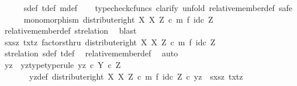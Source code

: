 \begin{isabellebody}
\ \ \ \ \isamarkupfalse%
\ s{\isacharunderscore}{\kern0pt}def\ t{\isacharunderscore}{\kern0pt}def\ m{\isacharunderscore}{\kern0pt}def\isanewline
\ \ \isamarkupfalse%
\ {\isacharparenleft}{\kern0pt}typecheck{\isacharunderscore}{\kern0pt}cfuncs{\isacharcomma}{\kern0pt}\ clarify{\isacharcomma}{\kern0pt}\ unfold\ relative{\isacharunderscore}{\kern0pt}member{\isacharunderscore}{\kern0pt}def{}{\isacharcomma}{\kern0pt}\ safe{\isacharparenright}{\kern0pt}\isanewline
\ \ \ \ \isamarkupfalse%
\ {\isachardoublequoteopen}monomorphism\ {\isacharparenleft}{\kern0pt}distribute{\isacharunderscore}{\kern0pt}right\ X\ X\ Z\ {\isasymcirc}\isactrlsub c\ m\ {\isasymtimes}\isactrlsub f\ id\isactrlsub c\ Z{\isacharparenright}{\kern0pt}{\isachardoublequoteclose}\isanewline
\ \ \ \ \ \ \isamarkupfalse%
\ relative{\isacharunderscore}{\kern0pt}member{\isacharunderscore}{\kern0pt}def{}\ st{\isacharunderscore}{\kern0pt}relation\ \isamarkupfalse%
\ blast\isanewline
\isanewline
\ \ \ \ \isamarkupfalse%
\ {\isachardoublequoteopen}{\isasymlangle}{\isasymlangle}sx{\isacharcomma}{\kern0pt}sz{\isasymrangle}{\isacharcomma}{\kern0pt}\ {\isasymlangle}tx{\isacharcomma}{\kern0pt}tz{\isasymrangle}{\isasymrangle}\ factorsthru\ {\isacharparenleft}{\kern0pt}distribute{\isacharunderscore}{\kern0pt}right\ X\ X\ Z\ {\isasymcirc}\isactrlsub c\ m\ {\isasymtimes}\isactrlsub f\ id\isactrlsub c\ Z{\isacharparenright}{\kern0pt}{\isachardoublequoteclose}\isanewline
\ \ \ \ \ \ \isamarkupfalse%
\ st{\isacharunderscore}{\kern0pt}relation\ s{\isacharunderscore}{\kern0pt}def\ t{\isacharunderscore}{\kern0pt}def\ \isamarkupfalse%
\ relative{\isacharunderscore}{\kern0pt}member{\isacharunderscore}{\kern0pt}def{}\ \isamarkupfalse%
\ auto\isanewline
\ \ \ \ \isamarkupfalse%
\ \isamarkupfalse%
\ yz\ \ yz{\isacharunderscore}{\kern0pt}type{\isacharbrackleft}{\kern0pt}type{\isacharunderscore}{\kern0pt}rule{\isacharbrackright}{\kern0pt}{\isacharcolon}{\kern0pt}\ {\isachardoublequoteopen}yz\ {\isasymin}\isactrlsub c\ Y\ {\isasymtimes}\isactrlsub c\ Z{\isachardoublequoteclose}\isanewline
\ \ \ \ \ \ \ yz{\isacharunderscore}{\kern0pt}def{\isacharcolon}{\kern0pt}\ {\isachardoublequoteopen}{\isacharparenleft}{\kern0pt}distribute{\isacharunderscore}{\kern0pt}right\ X\ X\ Z\ {\isasymcirc}\isactrlsub c\ {\isacharparenleft}{\kern0pt}m\ {\isasymtimes}\isactrlsub f\ id\isactrlsub c\ Z{\isacharparenright}{\kern0pt}{\isacharparenright}{\kern0pt}\ {\isasymcirc}\isactrlsub c\ yz\ {\isacharequal}{\kern0pt}\ {\isasymlangle}{\isasymlangle}sx{\isacharcomma}{\kern0pt}sz{\isasymrangle}{\isacharcomma}{\kern0pt}\ {\isasymlangle}tx{\isacharcomma}{\kern0pt}tz{\isasymrangle}{\isasymrangle}{\isachardoublequoteclose}\isanewline

\end{isabellebody}
